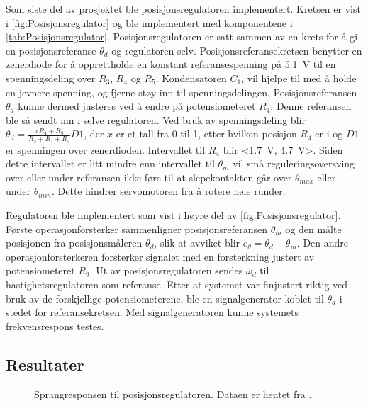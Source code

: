 Som siste del av prosjektet ble posisjonsregulatoren implementert. Kretsen er vist i \autoref{fig:Posisjonsregulator} og ble implementert med komponentene i \autoref{tab:Posisjonsregulator}. Posisjonsregulatoren er satt sammen av en krets for å gi en posisjonsreferanse $\theta_d$ og regulatoren selv.
Posisjonsreferansekretsen benytter en zenerdiode for å opprettholde en konstant referansespenning på {\SI{5.1}{\volt}} til en spenningsdeling over $R_3$, $R_4$ og $R_5$. 
Kondensatoren $C_1$, vil hjelpe til med å holde en jevnere spenning, og fjerne støy inn til spenningsdelingen. 
Posisjonsreferansen $\theta_d$ kunne dermed justeres ved å endre på potensiometeret $R_4$. Denne referansen ble så sendt inn i selve regulatoren. 
Ved bruk av spenningsdeling blir $\theta_d = \frac{x R_4 + R_5}{R_3 + R_4 + R_5} D1$, der $x$ er et tall fra 0 til 1, etter hvilken posisjon $R_4$ er i og $D1$ er spenningen over zenerdioden. 
Intervallet til $R_4$ blir <\SI{1.7}{\volt}, \SI{4.7}{\volt}>. 
Siden dette intervallet er litt mindre enn intervallet til $\theta_m$ vil små reguleringsoversving over eller under referansen ikke føre til at slepekontakten går over $\theta_{max}$ eller under $\theta_{min}$. Dette hindrer servomotoren fra å rotere hele runder.

Regulatoren ble implementert som vist i høyre del av \autoref{fig:Posisjonsregulator}. Første operasjonforsterker sammenligner posisjonsreferansen $\theta_m$ og den målte posisjonen fra posisjonsmåleren $\theta_d$, slik at avviket blir $e_{\theta} = \theta_d - \theta_m$. Den andre operasjonforsterkeren forsterker signalet med en forsterkning justert av potensiometeret $R_9$. Ut av posisjonsregulatoren sendes $\omega_d$ til hastighetsregulatoren som referanse.
Etter at systemet var finjustert riktig ved bruk av de forskjellige potensiometerene, ble en signalgenerator koblet til $\theta_d$ i stedet for referansekretsen. Med signalgeneratoren kunne systemets frekvensrespons testes.






\newpage
\subsection{Resultater}


\begin{figure}[h!]
    \centering
    
    \caption{Sprangresponsen til posisjonsregulatoren. Dataen er hentet fra \cite{EksempelData}.}
    \label{fig:posisjon_P_regulator}
\end{figure}

